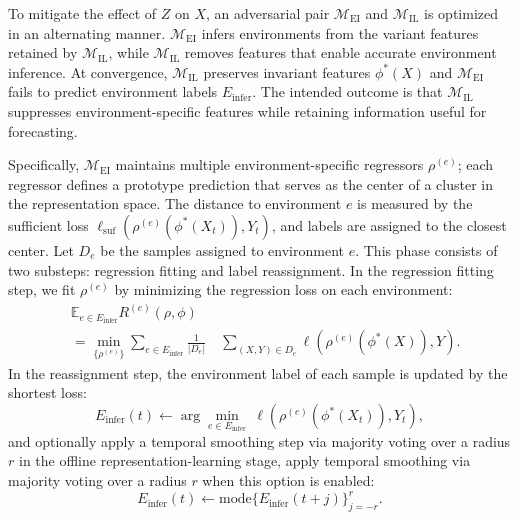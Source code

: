﻿\documentclass[journal]{IEEEtran}
\DeclareRobustCommand{\oldtext}[1]{{\color{revisionred}#1}}
\DeclareRobustCommand{\newtext}[1]{{\color{revisionblue}#1}}
\DeclareRobustCommand{\why}[1]{{\color{revisionblue}{\footnotesize (#1)}}}
\DeclareRobustCommand{\rw}[3]{\oldtext{#1} \newtext{#2}\why{#3}}
\begin{document}
To mitigate the effect of $Z$ on $X$, an adversarial pair $\mathcal{M}_{\mathrm{EI}}$ and $\mathcal{M}_{\mathrm{IL}}$ is optimized in an alternating manner. $\mathcal{M}_{\mathrm{EI}}$ infers environments from the variant features retained by $\mathcal{M}_{\mathrm{IL}}$, while $\mathcal{M}_{\mathrm{IL}}$ removes features that enable accurate environment inference. \rw{At convergence, $\mathcal{M}_{\mathrm{IL}}$ preserves invariant features $\phi^{*}(X)$ and $\mathcal{M}_{\mathrm{EI}}$ fails to predict environment labels $E_{\mathrm{infer}}$.}{The intended outcome is that $\mathcal{M}_{\mathrm{IL}}$ suppresses environment-specific features while retaining information useful for forecasting.}{避免声称已证明收敛到真正不变特征。} 

Specifically, $\mathcal{M}_{\mathrm{EI}}$ maintains multiple environment-specific regressors $\rho^{(e)}$; each regressor defines a prototype prediction that serves as the center of a cluster in the representation space. The distance to environment $e$ is measured by the sufficient loss $\ell_{\mathrm{suf}}(\rho^{(e)}(\phi^{*}(X_t)),Y_t)$, and labels are assigned to the closest center. Let $D_e$ be the samples assigned to environment $e$. This phase consists of two substeps: regression fitting and label reassignment. In the regression fitting step, we fit $\rho^{(e)}$ by minimizing the regression loss on each environment:
\begin{equation}
\begin{aligned}
&\mathbb{E}_{e\in E_{\mathrm{infer}}}R^{(e)}(\rho,\phi) \\
&= \min_{\{\rho^{(e)}\}}\sum_{e\in E_{\mathrm{infer}}}\frac{1}{|D_e|}
\quad \sum_{(X,Y)\in D_e}\ell\!\left(\rho^{(e)}(\phi^{*}(X)),Y\right).
\end{aligned}
\end{equation}
In the reassignment step, the environment label of each sample is updated by the shortest loss:
\begin{equation}
E_{\mathrm{infer}}(t)\leftarrow \arg\min_{e\in E_{\mathrm{infer}}}\ \ell\!\left(\rho^{(e)}(\phi^{*}(X_t)),Y_t\right),
\end{equation}
and \rw{optionally apply a temporal smoothing step via majority voting over a radius $r$}{in the offline representation-learning stage, apply temporal smoothing via majority voting over a radius $r$ when this option is enabled}{平滑使用未来邻域时必须限定为离线阶段，避免在线信息泄漏。}:
\begin{equation}
E_{\mathrm{infer}}(t)\leftarrow \mathrm{mode}\{E_{\mathrm{infer}}(t+j)\}_{j=-r}^{r}.
\end{equation}
\end{document}
